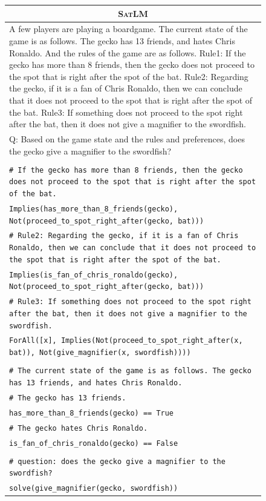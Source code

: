 \documentclass{article}
\theoremstyle{definition}
\newcommand{\satlm}{\textsc{SatLM}}
\begin{document}
\begin{figure}[h]
    \footnotesize
    \centering
    \begin{tabularx}{\linewidth}{X}
    \toprule
            \multicolumn{1}{c}{\textbf{\satlm{}} } \\
         \midrule
A few players are playing a boardgame. The current state of the game is as follows. The gecko has 13 friends, and hates Chris Ronaldo. And the rules of the game are as follows. Rule1: If the gecko has more than 8 friends, then the gecko does not proceed to the spot that is right after the spot of the bat. Rule2: Regarding the gecko, if it is a fan of Chris Ronaldo, then we can conclude that it does not proceed to the spot that is right after the spot of the bat. Rule3: If something does not proceed to the spot right after the bat, then it does not give a magnifier to the swordfish. \\
Q: Based on the game state and the rules and preferences, does the gecko give a magnifier to the swordfish?\\
\\
\tt    \# If the gecko has more than 8 friends, then the gecko does not proceed to the spot that is right after the spot of the bat. \\
\tt   Implies(has\_more\_than\_8\_friends(gecko), Not(proceed\_to\_spot\_right\_after(gecko, bat))) \\
\tt    \# Rule2: Regarding the gecko, if it is a fan of Chris Ronaldo, then we can conclude that it does not proceed to the spot that is right after the spot of the bat. \\
\tt Implies(is\_fan\_of\_chris\_ronaldo(gecko), Not(proceed\_to\_spot\_right\_after(gecko, bat)))\\
\tt    \# Rule3: If something does not proceed to the spot right after the bat, then it does not give a magnifier to the swordfish.\\
 \tt   ForAll([x], Implies(Not(proceed\_to\_spot\_right\_after(x, bat)), Not(give\_magnifier(x, swordfish))))\\
\\
 \tt   \# The current state of the game is as follows. The gecko has 13 friends, and hates Chris Ronaldo.\\
\tt    \# The gecko has 13 friends.\\
\tt    has\_more\_than\_8\_friends(gecko) == True\\
\tt    \# The gecko hates Chris Ronaldo.\\
\tt    is\_fan\_of\_chris\_ronaldo(gecko) == False\\
\\
 \tt   \# question: does the gecko give a magnifier to the swordfish? \\
\tt    solve(give\_magnifier(gecko, swordfish)) \\


\end{tabularx}
\end{figure}
\end{document}
